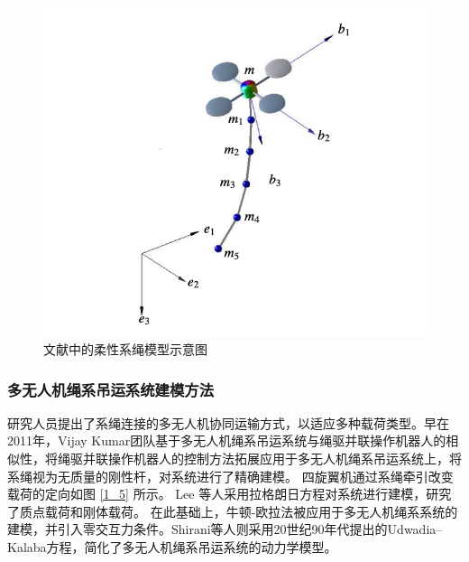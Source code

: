 \documentclass[lang=chs, degree=master, blindreview=false, winfonts=true]{yanputhesis}
\begin{document}
\begin{figure}[hbt!]
	\centering
	\includegraphics[width=28pc]{picture/1_4.png} 
	\caption{文献中的柔性系绳模型示意图} \label{1_4}
\end{figure}
\subsubsection{多无人机绳系吊运系统建模方法}
研究人员提出了系绳连接的多无人机协同运输方式，以适应多种载荷类型。早在2011年，Vijay Kumar团队\cite{Gouttefarde2006,Gouttefarde2011}基于多无人机绳系吊运系统与绳驱并联操作机器人\cite{Gouttefarde2006,Gouttefarde2011}的相似性，将绳驱并联操作机器人的控制方法拓展应用于多无人机绳系吊运系统上，将系绳视为无质量的刚性杆，对系统进行了精确建模\cite{Fink2011,michael2011cooperative,Jiang2013}。
四旋翼机通过系绳牵引改变载荷的定向如图 \ref{1_5} 所示。
Lee 等人采用拉格朗日方程对系统进行建模，研究了质点载荷\cite{lee2013geometric}和刚体载荷\cite{lee2017geometric}。
在此基础上，牛顿-欧拉法被应用于多无人机绳系系统的建模，并引入零交互力条件\cite{cardona2019cooperative}。Shirani等人\cite{shirani2019cooperative}则采用20世纪90年代提出的Udwadia–Kalaba方程\cite{udwadia1992new,udwadia1996equations}，简化了多无人机绳系吊运系统的动力学模型。
\end{document}
